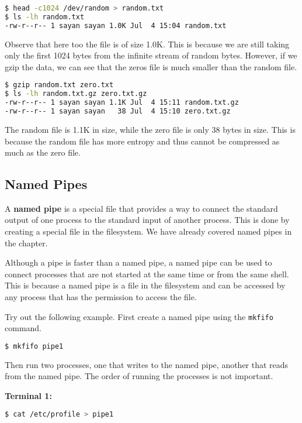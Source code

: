 \begin{lstlisting}[language=bash]
$ head -c1024 /dev/random > random.txt
$ ls -lh random.txt
-rw-r--r-- 1 sayan sayan 1.0K Jul  4 15:04 random.txt
\end{lstlisting}

Observe that here too the file is of size 1.0K. This is because we
are still taking only the first 1024 bytes from the infinite stream
of random bytes. However, if we gzip the data, we can see that the
zeros file is much smaller than the random file.

\begin{lstlisting}[language=bash]
$ gzip random.txt zero.txt
$ ls -lh random.txt.gz zero.txt.gz
-rw-r--r-- 1 sayan sayan 1.1K Jul  4 15:11 random.txt.gz
-rw-r--r-- 1 sayan sayan   38 Jul  4 15:10 zero.txt.gz
\end{lstlisting}

The random file is 1.1K in size, while the zero file is only 38 bytes
in size. This is because the random file has more entropy and thus
cannot be compressed as much as the zero file.

\subsection{Named Pipes}

A \textbf{named pipe} is a special file that provides a way to connect
the standard output of one process to the standard input of another
process. This is done by creating a special file in the filesystem.
We have already covered named pipes in the  chapter.

Although a pipe is faster than a named pipe, a named pipe can be used
to connect processes that are not started at the same time or from
the same shell. This is because a named pipe is a file in the filesystem
and can be accessed by any process that has the permission to access
the file.

Try out the following example. First create a named pipe using the
\texttt{mkfifo} command.

\begin{lstlisting}[language=bash]
$ mkfifo pipe1
\end{lstlisting}

Then run two processes, one that writes to the named pipe, another
that reads from the named pipe. The order of running the processes
is not important.

\textbf{Terminal 1:}
\begin{lstlisting}[language=bash]
$ cat /etc/profile > pipe1
\end{lstlisting}

